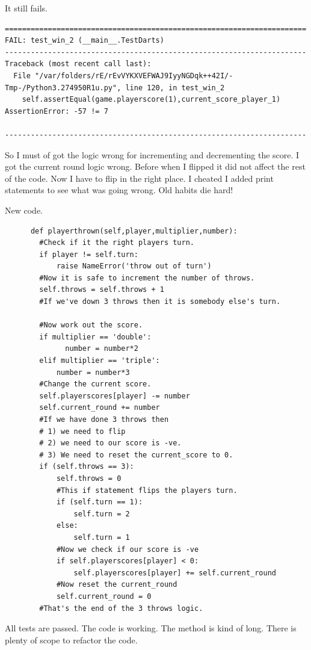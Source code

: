 \documentclass{paper}
\begin{document}
It still fails.
\begin{verbatim}
======================================================================
FAIL: test_win_2 (__main__.TestDarts)
----------------------------------------------------------------------
Traceback (most recent call last):
  File "/var/folders/rE/rEvVYKXVEFWAJ9IyyNGDqk++42I/-Tmp-/Python3.274950R1u.py", line 120, in test_win_2
    self.assertEqual(game.playerscore(1),current_score_player_1)
AssertionError: -57 != 7

----------------------------------------------------------------------
\end{verbatim}
So I must of got the logic wrong for incrementing and decrementing the
score. I got the current round logic wrong. Before when I flipped it
did not affect the rest of the code. Now I have to flip in the right place.
I cheated I added print statements to see what was going wrong. Old
habits die hard!

New code.
\begin{lstlisting}
      def playerthrown(self,player,multiplier,number):
        #Check if it the right players turn.
        if player != self.turn:
            raise NameError('throw out of turn')
        #Now it is safe to increment the number of throws.
        self.throws = self.throws + 1
        #If we've down 3 throws then it is somebody else's turn.

        #Now work out the score.
        if multiplier == 'double':
              number = number*2
        elif multiplier == 'triple':
            number = number*3
        #Change the current score.
        self.playerscores[player] -= number
        self.current_round += number
        #If we have done 3 throws then
        # 1) we need to flip
        # 2) we need to our score is -ve.
        # 3) We need to reset the current_score to 0.
        if (self.throws == 3):
            self.throws = 0
            #This if statement flips the players turn.
            if (self.turn == 1):
                self.turn = 2
            else:
                self.turn = 1
            #Now we check if our score is -ve
            if self.playerscores[player] < 0:
                self.playerscores[player] += self.current_round
            #Now reset the current_round
            self.current_round = 0
        #That's the end of the 3 throws logic.
\end{lstlisting}
All tests are passed. The code is working. 
The method is kind of long. There is plenty of scope to refactor the
code. 
\end{document}
